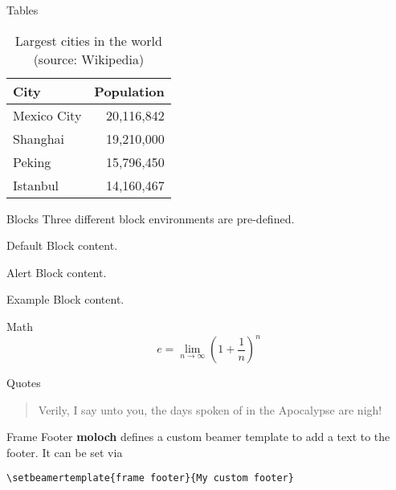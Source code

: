 \documentclass[10pt]{beamer}
\newcommand{\themename}{\textbf{moloch}\xspace}
\begin{document}
\begin{frame}{Tables}
  \begin{table}
    \caption{Largest cities in the world (source: Wikipedia)}
    \begin{tabular}{@{} lr @{}}
      \toprule
      City        & Population \\
      \midrule
      Mexico City & 20,116,842 \\
      Shanghai    & 19,210,000 \\
      Peking      & 15,796,450 \\
      Istanbul    & 14,160,467 \\
      \bottomrule
    \end{tabular}
  \end{table}
\end{frame}
\begin{frame}{Blocks}
  Three different block environments are pre-defined.

  \begin{block}{Default}
    Block content.
  \end{block}

  \begin{alertblock}{Alert}
    Block content.
  \end{alertblock}

  \begin{exampleblock}{Example}
    Block content.
  \end{exampleblock}

\end{frame}

\begin{frame}{Math}
  \begin{equation*}
    e = \lim_{n\to \infty} \left(1 + \frac{1}{n}\right)^n
  \end{equation*}
\end{frame}

\begin{frame}{Quotes}
  \begin{quote}
    Verily, I say unto you, the days spoken of in the Apocalypse are nigh!
  \end{quote}
\end{frame}

{%
\begin{frame}[fragile]{Frame Footer}
  \themename defines a custom beamer template to add a text to the footer. It can be set via
  \begin{verbatim}\setbeamertemplate{frame footer}{My custom footer}\end{verbatim}
\end{frame}
}
\end{document}
